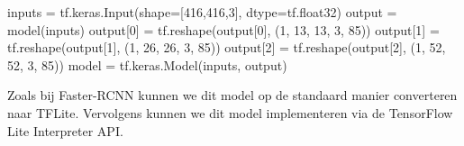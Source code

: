 \begin{python}
inputs = tf.keras.Input(shape=[416,416,3], dtype=tf.float32)
output = model(inputs)
output[0] =  tf.reshape(output[0], (1, 13, 13, 3, 85))
output[1] =  tf.reshape(output[1], (1, 26, 26, 3, 85))
output[2] =  tf.reshape(output[2], (1, 52, 52, 3, 85))
model = tf.keras.Model(inputs, output)
\end{python}

Zoals bij Faster-RCNN kunnen we dit model op de standaard manier converteren naar TFLite.
Vervolgens kunnen we dit model implementeren via de TensorFlow Lite Interpreter API.